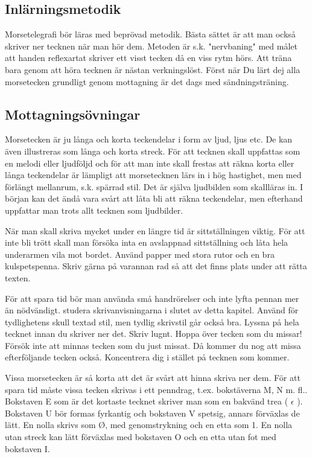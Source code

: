 \subsection{Inlärningsmetodik}

Morsetelegrafi bör läras med beprövad metodik. Bästa sättet är att man också
skriver ner tecknen när man hör dem. Metoden är s.k. "nervbaning" med målet att
handen reflexartat skriver ett visst tecken då en viss rytm hörs. Att träna bara
genom att höra tecknen är nästan verkningslöst. Först när Du lärt dej alla
morsetecken grundligt genom mottagning är det dags med sändningsträning.

\subsection{Mottagningsövningar}

Morsetecken är ju långa och korta teckendelar i form av ljud, ljus etc. De kan
även illustreras som långa och korta streck. För att tecknen skall uppfattas som
en melodi eller ljudföljd och för att man inte skall frestas att räkna korta
eller långa teckendelar är lämpligt att morsetecknen lärs in i hög hastighet,
men med förlängt mellanrum, s.k. spärrad stil. Det är själva ljudbilden som
skallläras in. I början kan det ändå vara svårt att låta bli att räkna
teckendelar, men efterhand uppfattar man trots allt tecknen som ljudbilder.

När man skall skriva mycket under en längre tid är sittställningen viktig. För
att inte bli trött skall man försöka inta en avslappnad sittställning och låta
hela underarmen vila mot bordet. Använd papper med stora rutor och en bra
kulspetspenna. Skriv gärna på varannan rad så att det finns plats under att
rätta texten.

För att spara tid bör man använda små handrörelser och inte lyfta pennan mer än
nödvändigt. studera skrivanvisningarna i slutet av detta kapitel. Använd för
tydlighetens skull textad stil, men tydlig skrivstil går också bra. Lyssna på
hela tecknet innan du skriver ner det. Skriv lugnt. Hoppa över tecken som du
missar! Försök inte att minnas tecken som du just missat. Då kommer du nog att
missa efterföljande tecken också. Koncentrera dig i stället på tecknen som
kommer.

Vissa morsetecken är så korta att det är svårt att hinna skriva ner dem. För att
spara tid måste vissa tecken skrivas i ett penndrag, t.ex. bokstäverna M, N m.
fl.. Bokstaven E som är det kortaste tecknet skriver man som en bakvänd trea (
\(\epsilon\) ). Bokstaven U bör formas fyrkantig och bokstaven V spetsig, annars
förväxlas de lätt. En nolla skrivs som Ø, med genomstrykning och en etta som 1.
En nolla utan streck kan lätt förväxlas med bokstaven O och en etta utan fot med
bokstaven I.

